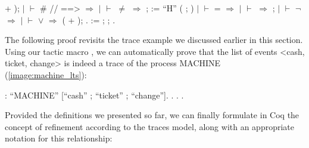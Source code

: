\begin{coqdoccode}
	+  ); \coqdoceol
	\coqdocindent{1.00em}
	\ensuremath{|} \ensuremath{\vdash} \coqdocvar{\_} \#  //  ==> \coqdocvar{\_} \ensuremath{\Rightarrow}  \coqdoceol
	\coqdocindent{1.00em}
	\ensuremath{|} \ensuremath{\vdash} \coqdocvar{\_} \ensuremath{\not=} \coqdocvar{\_} \ensuremath{\Rightarrow}  ;   :=  ``H''  ( ;  )\coqdoceol
	\coqdocindent{1.00em}
	\ensuremath{|} \ensuremath{\vdash} \coqdocvar{\_} = \coqdocvar{\_} \ensuremath{\Rightarrow} \coqdoceol
	\coqdocindent{1.00em}
	\ensuremath{|} \ensuremath{\vdash}  \coqdocvar{\_} \coqdocvar{\_} \ensuremath{\Rightarrow} ; \coqdoceol
	\coqdocindent{1.00em}
	\ensuremath{|} \ensuremath{\vdash} \ensuremath{\lnot}  \coqdocvar{\_} \coqdocvar{\_} \ensuremath{\Rightarrow} \coqdoceol
	\coqdocindent{1.00em}
	\ensuremath{|} \ensuremath{\vdash} \coqdocvar{\_} \ensuremath{\lor} \coqdocvar{\_} \ensuremath{\Rightarrow} ( + ); \coqdoceol
	\coqdocindent{1.00em}
	.\coqdoceol
	\coqdocemptyline
	\coqdocnoindent
	  :=  ; ; .\coqdoceol
\end{coqdoccode}

The following proof revisits the trace example we discussed earlier in this section. Using our tactic macro , we can automatically prove that the list of events <cash, ticket, change> is indeed a trace of the process MACHINE (\autoref{image:machine_lts}):

\begin{coqdoccode}
	\coqdocnoindent
	  :\coqdoceol
	\coqdocindent{1.00em}
	  ``MACHINE'' [``cash'' ; ``ticket'' ; ``change''].\coqdoceol
	\coqdocnoindent
	. . .\coqdoceol
\end{coqdoccode}

Provided the definitions we presented so far, we can finally formulate in Coq the concept of refinement according to the traces model, along with an appropriate notation for this relationship:

